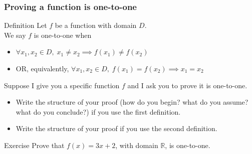 \begin{frame}
	\frametitle{Proving a function is one-to-one}
	\fontsize{13}{13}\selectfont

	\begin{block}{Definition}
		Let $f$ be a function with domain $D$. \\ We say $f$ is one-to-one when
		\begin{itemize}
			\item \hfill $\displaystyle \forall x_{1}, x_{2}\in D, \; x_{1}\neq x_{2}\implies
				f(x_{1}) \neq f(x_{2})$

			\item OR, equivalently, \hfill $\displaystyle \forall x_{1}, x_{2}\in D, \;
				f(x_{1}) = f(x_{2}) \implies x_{1}= x_{2}$
		\end{itemize}
	\end{block}

	\vfill

	Suppose I give you a specific function $f$ and I ask you to prove it is one-to-one.
	\begin{itemize}
		\item Write the structure of your proof (how do you begin? what do you assume?
			what do you conclude?) if you use the first definition.

		\item Write the structure of your proof if you use the second definition.
	\end{itemize}

	\vfill

	\begin{block}{Exercise}
		Prove that $f(x) = 3x + 2$, with domain $\mathbb{R}$, is one-to-one.
	\end{block}
\end{frame}

